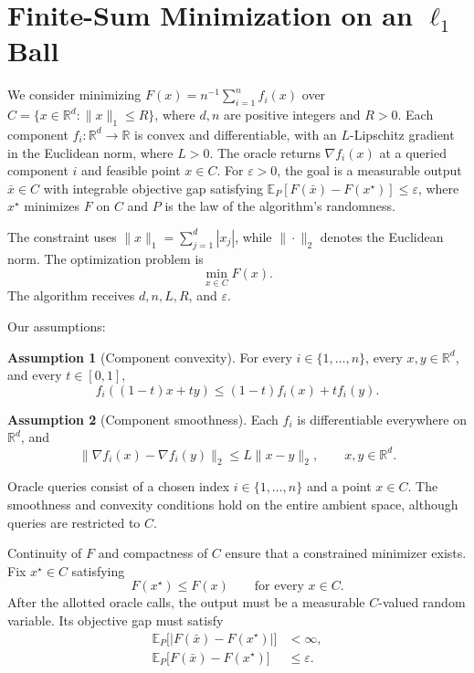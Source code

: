 \documentclass[10pt]{article}
\theoremstyle{definition}
\newtheorem{assumption}{Assumption}
\begin{document}
\section*{Finite-Sum Minimization on an $\ell_1$ Ball}
We consider minimizing $F(x)=n^{-1}\sum_{i=1}^n f_i(x)$ over $C=\{x\in\mathbb{R}^d:\|x\|_1\leq R\}$, where $d,n$ are positive integers and $R>0$. Each component $f_i:\mathbb{R}^d\to\mathbb{R}$ is convex and differentiable, with an $L$-Lipschitz gradient in the Euclidean norm, where $L>0$. The oracle returns $\nabla f_i(x)$ at a queried component $i$ and feasible point $x\in C$. For $\varepsilon>0$, the goal is a measurable output $\bar{x}\in C$ with integrable objective gap satisfying $\mathbb{E}_{P}[F(\bar{x})-F(x^\star)]\leq\varepsilon$, where $x^\star$ minimizes $F$ on $C$ and $P$ is the law of the algorithm's randomness.

The constraint uses $\|x\|_1=\sum_{j=1}^d|x_j|$, while $\|\cdot\|_2$ denotes the Euclidean norm. The optimization problem is
\[
\min_{x\in C} F(x).
\]
The algorithm receives $d,n,L,R$, and $\varepsilon$.

Our assumptions:
\begin{assumption}[Component convexity]
For every $i\in\{1,\ldots,n\}$, every $x,y\in\mathbb{R}^d$, and every $t\in[0,1]$,
\[
f_i((1-t)x+ty)\leq (1-t)f_i(x)+t f_i(y).
\]
\end{assumption}

\begin{assumption}[Component smoothness]
Each $f_i$ is differentiable everywhere on $\mathbb{R}^d$, and
\[
\|\nabla f_i(x)-\nabla f_i(y)\|_2
\leq L\|x-y\|_2,
\qquad x,y\in\mathbb{R}^d.
\]
\end{assumption}

Oracle queries consist of a chosen index $i\in\{1,\ldots,n\}$ and a point $x\in C$. The smoothness and convexity conditions hold on the entire ambient space, although queries are restricted to $C$.

Continuity of $F$ and compactness of $C$ ensure that a constrained minimizer exists. Fix $x^\star\in C$ satisfying
\[
F(x^\star)\leq F(x)\qquad\text{for every }x\in C.
\]
After the allotted oracle calls, the output must be a measurable $C$-valued random variable. Its objective gap must satisfy
\[
\begin{aligned}
\mathbb{E}_{P}\bigl[|F(\bar{x})-F(x^\star)|\bigr]&<\infty,\\
\mathbb{E}_{P}\bigl[F(\bar{x})-F(x^\star)\bigr]&\leq\varepsilon.
\end{aligned}
\]
\end{document}
